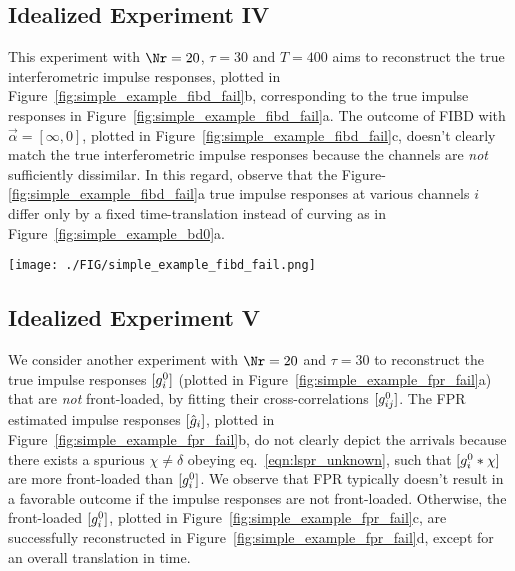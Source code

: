 \subsection{Idealized Experiment IV}
This 
experiment with $\Nr=20$,
$\tau=30$ and $T=400$  
aims to reconstruct the true 
interferometric impulse responses, plotted in 
Figure~\ref{fig:simple_example_fibd_fail}b, corresponding to the 
true impulse responses in Figure~\ref{fig:simple_example_fibd_fail}a.
%
The outcome of 
FIBD with $\vec{\alpha}=[\infty,0]$, plotted in Figure~\ref{fig:simple_example_fibd_fail}c,
doesn't clearly match the true 
interferometric impulse responses
because the channels are \emph{not} sufficiently dissimilar.
%
In this regard,
observe that the Figure-\ref{fig:simple_example_fibd_fail}a
true impulse responses 
at various channels 
$i$ differ only by a fixed time-translation instead 
of curving as in Figure~\ref{fig:simple_example_bd0}a.
%
\begin{figure*}
	\centering
	{
	\texttt{[image: ./FIG/simple\_example\_fibd\_fail.png]}
		}
	{
	\begin{tikzpicture}
		
	\end{tikzpicture}
	}
	\caption{ Idealized Experiment IV. 
		a) True impulse responses of channels that are not sufficiently dissimilar.
		b) True interferometric impulse responses corresponding to (a).
		c) FIBD estimated interferometric 
		impulse responses corresponding to (b), 
		after fitting the
		interferometric channel outputs.
	}
	\label{fig:simple_example_fibd_fail}
\end{figure*}


\subsection{Idealized Experiment V}
We consider another 
experiment with $\Nr=20$ 
and $\tau=30$
to reconstruct the true impulse responses $\vecc{g^{0}_{i}}$ 
(plotted in Figure~\ref{fig:simple_example_fpr_fail}a) that are 
\emph{not} front-loaded, by fitting their
cross-correlations
$\vecc{g^0_{ij}}$.
%
The FPR estimated impulse responses $\vecc{\hat{g}_{i}}$, plotted in 
Figure~\ref{fig:simple_example_fpr_fail}b, 
do not 
clearly depict the arrivals 
because there exists a spurious
$\chi\ne\delta$ obeying 
eq.~\ref{eqn:lspr_unknown}, such that $\vecc{g^0_{i}\ast \chi}$ are
more front-loaded than $\vecc{g^0_{i}}$.
%
We observe that
FPR typically doesn't result in a favorable outcome 
if the impulse responses are not front-loaded.
%
Otherwise, 
the 
front-loaded 
$\vecc{g^{0}_{i}}$, plotted in Figure~\ref{fig:simple_example_fpr_fail}c, 
are successfully reconstructed in Figure~\ref{fig:simple_example_fpr_fail}d,
except 
for an overall translation in time.

